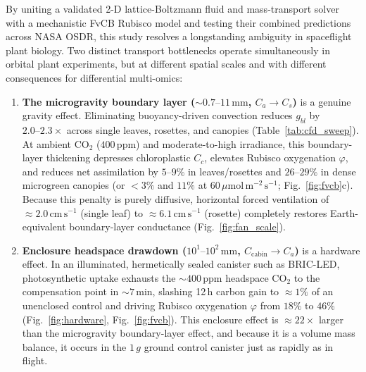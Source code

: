 \documentclass[10pt,twocolumn,a4paper]{article}
\newcommand{\ums}{\ensuremath{\mu\mathrm{mol\,m^{-2}\,s^{-1}}}}
\newcommand{\cmsu}{\ensuremath{\mathrm{cm\,s^{-1}}}}
\begin{document}
By uniting a validated 2-D lattice-Boltzmann fluid and mass-transport solver with a mechanistic FvCB Rubisco model and testing their combined predictions across NASA OSDR, this study resolves a longstanding ambiguity in spaceflight plant biology. Two distinct transport bottlenecks operate simultaneously in orbital plant experiments, but at different spatial scales and with different consequences for differential multi-omics:
\begin{enumerate}
    \item \textbf{The microgravity boundary layer ($\sim 0.7\text{--}11\,\mathrm{mm}$, $C_a \to C_s$)} is a genuine gravity effect. Eliminating buoyancy-driven convection reduces $g_{bl}$ by $2.0\text{--}2.3\times$ across single leaves, rosettes, and canopies (Table~\ref{tab:cfd_sweep}). At ambient $\mathrm{CO_2}$ ($400\,\mathrm{ppm}$) and moderate-to-high irradiance, this boundary-layer thickening depresses chloroplastic $C_c$, elevates Rubisco oxygenation $\varphi$, and reduces net assimilation by $5\text{--}9\%$ in leaves/rosettes and $26\text{--}29\%$ in dense microgreen canopies (or $<3\%$ and $11\%$ at $60\,\ums$; Fig.~\ref{fig:fvcb}c). Because this penalty is purely diffusive, horizontal forced ventilation of $\approx 2.0\,\cmsu$ (single leaf) to $\approx 6.1\,\cmsu$ (rosette) completely restores Earth-equivalent boundary-layer conductance (Fig.~\ref{fig:fan_scale}).
    \item \textbf{Enclosure headspace drawdown ($10^1\text{--}10^2\,\mathrm{mm}$, $C_{\text{cabin}} \to C_a$)} is a hardware effect. In an illuminated, hermetically sealed canister such as BRIC-LED, photosynthetic uptake exhausts the $\sim 400\,\mathrm{ppm}$ headspace $\mathrm{CO_2}$ to the compensation point in $\sim 7\,\mathrm{min}$, slashing 12\,h carbon gain to $\approx 1\%$ of an unenclosed control and driving Rubisco oxygenation $\varphi$ from $18\%$ to $46\%$ (Fig.~\ref{fig:hardware}, Fig.~\ref{fig:fvcb}). This enclosure effect is $\approx 22\times$ larger than the microgravity boundary-layer effect, and because it is a volume mass balance, it occurs in the $1\,g$ ground control canister just as rapidly as in flight.
\end{enumerate}
\end{document}
